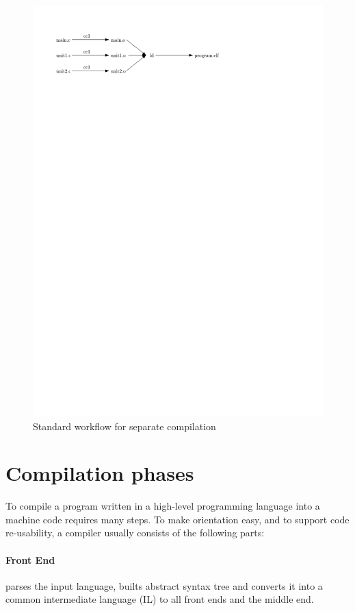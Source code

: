 \begin{figure}[h!]
\label{figure-non-lto-workflow}
\centering
\includegraphics{./img/non-lto-workflow.pdf}
\caption{Standard workflow for separate compilation}
\end{figure}


\section{Compilation phases}

To compile a program written in a high-level programming language into a machine
code requires many steps. To make orientation easy, and to support code
re-usability, a compiler usually consists of the following parts:

\paragraph{Front End} parses the input language, builts abstract syntax
tree and converts it into a common intermediate language (IL) to all front ends
and the middle end.

